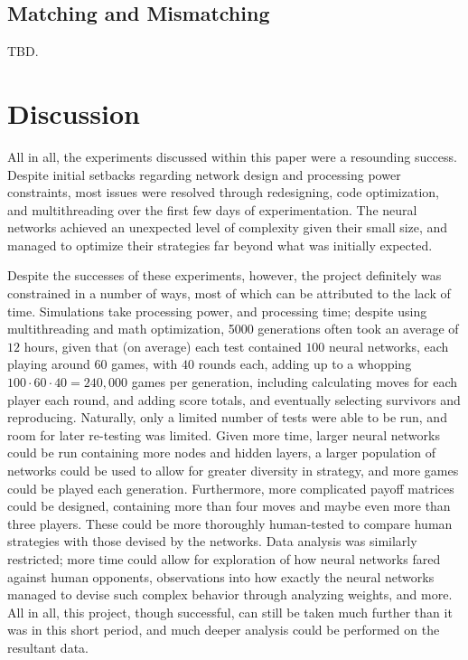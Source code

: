 \documentclass{article}
\begin{document}
\subsection{Matching and Mismatching}

TBD.

\section{Discussion}

All in all, the experiments discussed within this paper were a resounding success. Despite initial setbacks regarding network design and processing power constraints, most issues were resolved through redesigning, code optimization, and multithreading over the first few days of experimentation. The neural networks achieved an unexpected level of complexity given their small size, and managed to optimize their strategies far beyond what was initially expected.

Despite the successes of these experiments, however, the project definitely was constrained in a number of ways, most of which can be attributed to the lack of time. Simulations take processing power, and processing time; despite using multithreading and math optimization, 5000 generations often took an average of $12$ hours, given that (on average) each test contained $100$ neural networks, each playing around $60$ games, with $40$ rounds each, adding up to a whopping $100\cdot60\cdot40=240,000$ games per generation, including calculating moves for each player each round, and adding score totals, and eventually selecting survivors and reproducing. Naturally, only a limited number of tests were able to be run, and room for later re-testing was limited. Given more time, larger neural networks could be run containing more nodes and hidden layers, a larger population of networks could be used to allow for greater diversity in strategy, and more games could be played each generation. Furthermore, more complicated payoff matrices could be designed, containing more than four moves and maybe even more than three players. These could be more thoroughly human-tested to compare human strategies with those devised by the networks. Data analysis was similarly restricted; more time could allow for exploration of how neural networks fared against human opponents, observations into how exactly the neural networks managed to devise such complex behavior through analyzing weights, and more. All in all, this project, though successful, can still be taken much further than it was in this short period, and much deeper analysis could be performed on the resultant data.
\end{document}
